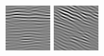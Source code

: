 \begin{figure}
\begin{center}
  \includegraphics[width=\columnwidth/9]{ch4/figures/imag_0_4.jpg}
  \includegraphics[width=\columnwidth/9]{ch4/figures/imag_0_5.jpg}

\end{center}
\end{figure}
